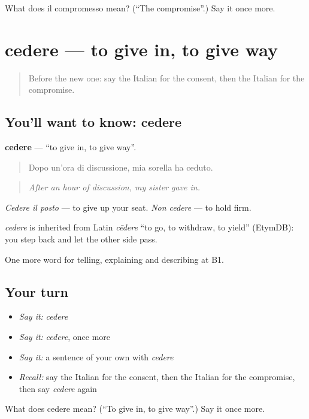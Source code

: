\begin{tcolorbox}[breakable,colback=teal!4,colframe=teal!35!black,title={Before you move on}]
What does il compromesso mean? (\textquotedblleft{}The compromise\textquotedblright{}.) Say it once more.
\end{tcolorbox}
\section[cedere]{cedere — to give in, to give way}

\label{lesson:IT-C342-cedere}



\begin{quote}
Before the new one: say the Italian for the consent, then the Italian for the compromise.
\end{quote}

\subsection*{You'll want to know: cedere}
\textbf{cedere} — \textquotedblleft{}to give in, to give way\textquotedblright{}.

\begin{quote}
Dopo un'ora di discussione, mia sorella ha ceduto.
\end{quote}

\begin{quote}
\emph{After an hour of discussion, my sister gave in.}
\end{quote}

\emph{Cedere il posto} — to give up your seat. \emph{Non cedere} — to hold firm.

\begin{cousinweb}
\emph{cedere} is inherited from Latin \emph{cēdere} \textquotedblleft{}to go, to withdraw, to yield\textquotedblright{} (EtymDB): you step back and let the other side pass.
\end{cousinweb}

\begin{grammarlens}[title={What you've built}]
One more word for telling, explaining and describing at B1.
\end{grammarlens}

\subsection*{Your turn}
\begin{itemize}
\raggedright
  \item \emph{Say it:} \emph{cedere}
  \item \emph{Say it:} \emph{cedere}, once more
  \item \emph{Say it:} a sentence of your own with \emph{cedere}
  \item \emph{Recall:} say the Italian for the consent, then the Italian for the compromise, then say \emph{cedere} again
\end{itemize}

\begin{tcolorbox}[breakable,colback=teal!4,colframe=teal!35!black,title={Before you move on}]
What does cedere mean? (\textquotedblleft{}To give in, to give way\textquotedblright{}.) Say it once more.
\end{tcolorbox}
